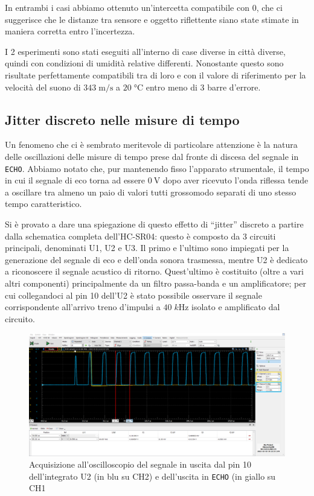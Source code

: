 \documentclass[10pt, a4paper, italian]{article}
\begin{document}
In entrambi i casi abbiamo ottenuto un'intercetta compatibile con 0, che ci
suggerisce che le distanze tra sensore e oggetto riflettente siano state
stimate in maniera corretta entro l'incertezza.

I 2 esperimenti sono stati eseguiti all'interno di case diverse in città
diverse, quindi con condizioni di umidità relative differenti. Nonostante
questo sono risultate perfettamente compatibili tra di loro e con il valore
di riferimento per la velocità del suono di $343 \; \si{\m/\s}$ a
$20 \; \si{\degreeCelsius}$ entro meno di 3 barre d'errore.

\subsection{Jitter discreto nelle misure di tempo}
Un fenomeno che ci è sembrato meritevole di particolare attenzione è la natura
delle oscillazioni delle misure di tempo prese dal fronte di discesa del
segnale in \verb+ECHO+.
Abbiamo notato che, pur mantenendo fisso l'apparato strumentale, il tempo
in cui il segnale di eco torna ad essere $\SI{0}{\V}$ dopo aver ricevuto l'onda
riflessa tende a oscillare tra almeno un paio di valori tutti grossomodo
separati di uno stesso tempo caratteristico.

Si è provato a dare una spiegazione di questo effetto di ``jitter'' discreto 
a partire dalla schematica completa dell'HC-SR04: questo è composto da 3
circuiti principali, denominati U1, U2 e U3. Il primo e l'ultimo sono impiegati
per la generazione del segnale di eco e dell'onda sonora trasmessa, mentre U2 è
dedicato a riconoscere il segnale acustico di ritorno.
Quest'ultimo è costituito (oltre a vari altri componenti) principalmente da un
filtro passa-banda e un amplificatore; per cui collegandoci al pin 10 dell'U2
è stato possibile osservare il segnale corrispondente all'arrivo treno
d'impulsi a $40 \; \si{k\Hz}$ isolato e amplificato dal circuito.
\begin{figure}[htbp]
    \centering
	\includegraphics[width=\textwidth]{jitter2}
    \caption{Acquisizione all'oscilloscopio del segnale in uscita dal pin 10
    dell'integrato U2 (in blu su CH2) e dell'uscita in \texttt{ECHO} (in giallo
    su CH1}
\end{figure}
\end{document}
